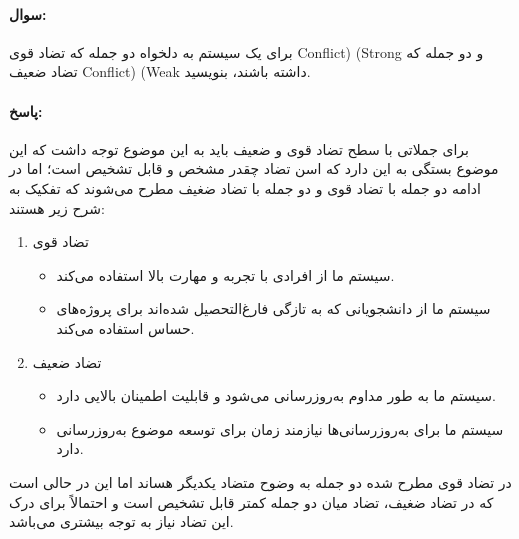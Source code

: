\documentclass[a4paper,10pt]{article}
\begin{document}
    \paragraph{سوال:} برای یک سیستم به دلخواه دو جمله که تضاد قوی Conflict) (Strong و دو جمله که تضاد ضعیف Conflict) (Weak داشته باشند، بنویسید.

    \paragraph{پاسخ:} برای جملاتی با سطح تضاد قوی و ضعیف باید به این موضوع توجه داشت که این موضوع بستگی به این دارد که اسن تضاد چقدر مشخص و قابل تشخیص است؛ اما در ادامه دو جمله با تضاد قوی و دو جمله با تضاد ضغیف مطرح می‌شوند که تفکیک به شرح زیر هستند:

    \begin{enumerate}
        
        \item تضاد قوی

        \begin{itemize}
            
            \item سیستم ما از افرادی با تجربه و مهارت بالا استفاده می‌کند.

            \item سیستم ما از دانشجویانی که به تازگی فارغ‌التحصیل شده‌اند برای پروژه‌های حساس استفاده می‌کند.

        \end{itemize}

        \item تضاد ضعیف
        
        \begin{itemize}
            
            \item سیستم ما به طور مداوم به‌روزرسانی می‌شود و قابلیت اطمینان بالایی دارد.

            \item سیستم ما برای به‌روزرسانی‌ها نیازمند زمان برای توسعه موضوع به‌روزرسانی دارد.

        \end{itemize}

    \end{enumerate}

    در تضاد قوی مطرح شده دو جمله به وضوح متضاد یکدیگر هساند اما این در حالی است که در تضاد ضغیف، تضاد میان دو جمله کمتر قابل تشخیص است و احتمالاً برای درک این تضاد نیاز به توجه بیشتری می‌باشد.
\end{document}
